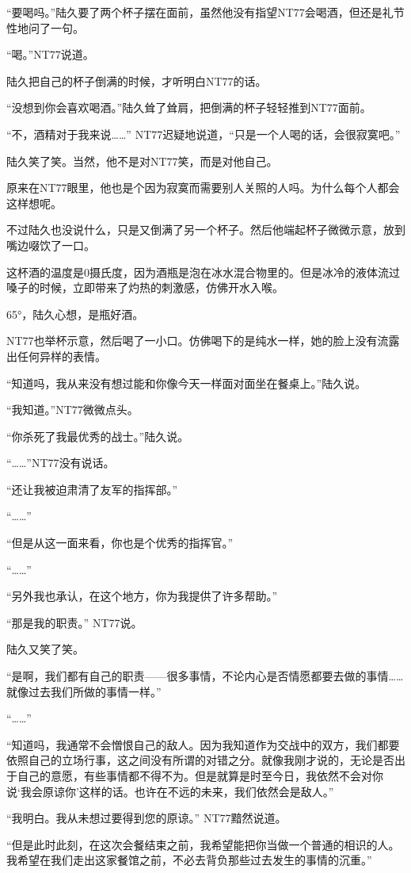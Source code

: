 “要喝吗。”陆久要了两个杯子摆在面前，虽然他没有指望NT77会喝酒，但还是礼节性地问了一句。

“喝。”NT77说道。

陆久把自己的杯子倒满的时候，才听明白NT77的话。

“没想到你会喜欢喝酒。”陆久耸了耸肩，把倒满的杯子轻轻推到NT77面前。

“不，酒精对于我来说……” NT77迟疑地说道，“只是一个人喝的话，会很寂寞吧。”

陆久笑了笑。当然，他不是对NT77笑，而是对他自己。

原来在NT77眼里，他也是个因为寂寞而需要别人关照的人吗。为什么每个人都会这样想呢。

不过陆久也没说什么，只是又倒满了另一个杯子。然后他端起杯子微微示意，放到嘴边啜饮了一口。

这杯酒的温度是0摄氏度，因为酒瓶是泡在冰水混合物里的。但是冰冷的液体流过嗓子的时候，立即带来了灼热的刺激感，仿佛开水入喉。

65°，陆久心想，是瓶好酒。

NT77也举杯示意，然后喝了一小口。仿佛喝下的是纯水一样，她的脸上没有流露出任何异样的表情。

“知道吗，我从来没有想过能和你像今天一样面对面坐在餐桌上。”陆久说。

“我知道。”NT77微微点头。

“你杀死了我最优秀的战士。”陆久说。

“……”NT77没有说话。

“还让我被迫肃清了友军的指挥部。”

“……”

“但是从这一面来看，你也是个优秀的指挥官。”

“……”

“另外我也承认，在这个地方，你为我提供了许多帮助。”

“那是我的职责。” NT77说。

陆久又笑了笑。

“是啊，我们都有自己的职责——很多事情，不论内心是否情愿都要去做的事情……就像过去我们所做的事情一样。”

“……”

“知道吗，我通常不会憎恨自己的敌人。因为我知道作为交战中的双方，我们都要依照自己的立场行事，这之间没有所谓的对错之分。就像我刚才说的，无论是否出于自己的意愿，有些事情都不得不为。但是就算是时至今日，我依然不会对你说‘我会原谅你’这样的话。也许在不远的未来，我们依然会是敌人。”

“我明白。我从未想过要得到您的原谅。” NT77黯然说道。

“但是此时此刻，在这次会餐结束之前，我希望能把你当做一个普通的相识的人。我希望在我们走出这家餐馆之前，不必去背负那些过去发生的事情的沉重。”

